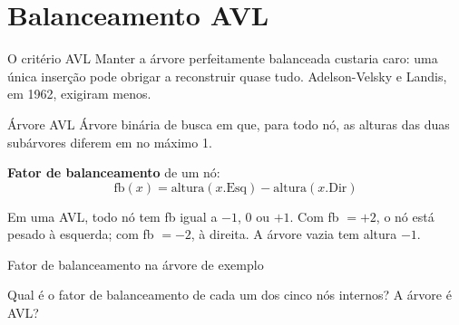 \documentclass{beamer}
\begin{document}
\section{Balanceamento AVL}

\begin{frame}{O critério AVL}
  Manter a árvore perfeitamente balanceada custaria caro: uma única inserção
  pode obrigar a reconstruir quase tudo. Adelson-Velsky e Landis, em 1962,
  exigiram menos.

  \vspace{0.4cm}
  \begin{block}{Árvore AVL}
    Árvore binária de busca em que, para todo nó, as alturas das duas
    subárvores diferem em no máximo 1.
  \end{block}

  \vspace{0.4cm}
  \textbf{Fator de balanceamento} de um nó:
  $$\mathrm{fb}(x) = \mathrm{altura}(x.\mathrm{Esq}) - \mathrm{altura}(x.\mathrm{Dir})$$

  Em uma AVL, todo nó tem fb igual a $-1$, 0 ou $+1$. Com fb $= +2$, o nó está
  pesado à esquerda; com fb $= -2$, à direita. A árvore vazia tem altura $-1$.
\end{frame}

\begin{frame}{Fator de balanceamento na árvore de exemplo}
  \begin{center}
  \end{center}

  \vspace{0.2cm}
  Qual é o fator de balanceamento de cada um dos cinco nós internos? A árvore é
  AVL?
\end{frame}
\end{document}
